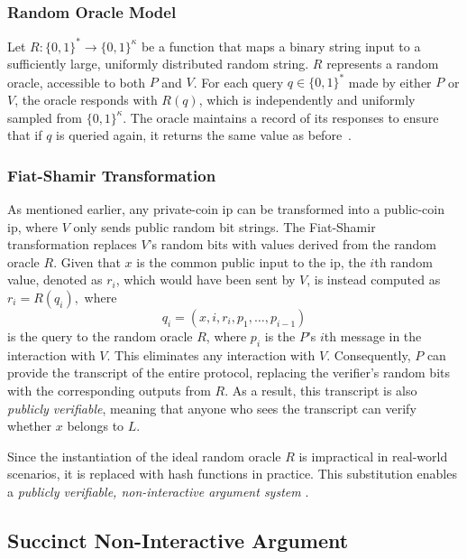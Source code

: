 \subsubsection{Random Oracle Model}
Let \( R: \{0,1\}^* \rightarrow \{0,1\}^\kappa \) be a function that maps a binary string input to a sufficiently large, uniformly distributed random string. \( R \) represents a random oracle, accessible to both \( P \) and \( V \). For each query \( q \in \{0,1\}^* \) made by either \( P \) or \( V \), the oracle responds with \( R(q) \), which is independently and uniformly sampled from \( \{0,1\}^\kappa \). The oracle maintains a record of its responses to ensure that if \( q \) is queried again, it returns the same value as before~\cite{Thaler2022Proofs}.



\subsubsection{Fiat-Shamir Transformation}
As mentioned earlier, any private-coin \gls{ip} can be transformed into a public-coin \gls{ip}, where \( V \) only sends public random bit strings. The Fiat-Shamir transformation replaces \( V \)'s random bits with values derived from the random oracle \( R \). Given that \( x \) is the common public input to the \gls{ip}, the \( i \)th random value, denoted as \( r_i \), which would have been sent by \( V \), is instead computed as 
\(
r_i = R(q_i),
\)
where 
\[
q_i = (x, i, r_i, p_1, \dots, p_{i-1}) 
\]
is the query to the random oracle \( R \), where $p_i$ is the $P$'s $i$th message in the interaction with $V$. This eliminates any interaction with \( V \). Consequently, \( P \) can provide the transcript of the entire protocol, replacing the verifier's random bits with the corresponding outputs from \( R \). As a result, this transcript is also \textit{publicly verifiable}, meaning that anyone who sees the transcript can verify whether \( x \) belongs to \( L \).

Since the instantiation of the ideal random oracle \( R \) is impractical in real-world scenarios, it is replaced with hash functions in practice. This substitution enables a \textit{publicly verifiable, non-interactive argument system} \cite{Thaler2022Proofs}.

\subsection{Succinct Non-Interactive Argument}

